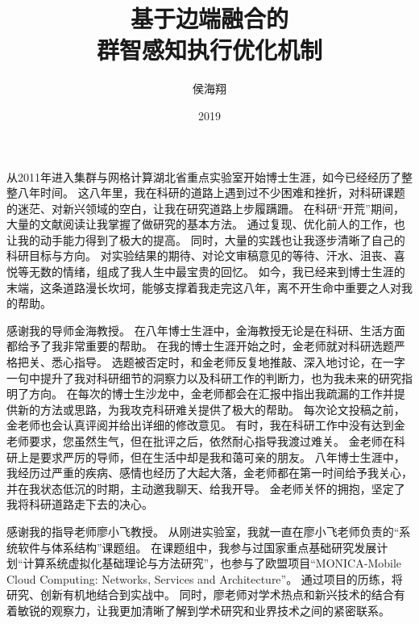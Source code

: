 \documentclass[format=draft,language=chinese,degree=phd,table,usenames,dvipsnames]{hustthesis}
\title{基于边端融合的\\群智感知执行优化机制}{Resources Scheduling Allocation and Optimization \protect{\\} for Mobile Crowdsensing in Edge Computing}
\author{侯海翔}{Haixiang Hou}
\date{2019}{6}{1}
\begin{document}
\frontmatter
\maketitle
\makeabstract
\tableofcontents
\listoffigures
\listoftables
\mainmatter













\begin{ack}

从2011年进入集群与网格计算湖北省重点实验室开始博士生涯，如今已经经历了整整八年时间。
这八年里，我在科研的道路上遇到过不少困难和挫折，对科研课题的迷茫、对新兴领域的空白，让我在研究道路上步履蹒跚。
在科研“开荒”期间，大量的文献阅读让我掌握了做研究的基本方法。
通过复现、优化前人的工作，也让我的动手能力得到了极大的提高。
同时，大量的实践也让我逐步清晰了自己的科研目标与方向。
对实验结果的期待、对论文审稿意见的等待、汗水、沮丧、喜悦等无数的情绪，组成了我人生中最宝贵的回忆。
如今，我已经来到博士生涯的末端，这条道路漫长坎坷，能够支撑着我走完这八年，离不开生命中重要之人对我的帮助。

感谢我的导师金海教授。
在八年博士生涯中，金海教授无论是在科研、生活方面都给予了我非常重要的帮助。
在我的博士生涯开始之时，金老师就对科研选题严格把关、悉心指导。
选题被否定时，和金老师反复地推敲、深入地讨论，在一字一句中提升了我对科研细节的洞察力以及科研工作的判断力，也为我未来的研究指明了方向。
在每次的博士生沙龙中，金老师都会在汇报中指出我疏漏的工作并提供新的方法或思路，为我攻克科研难关提供了极大的帮助。
每次论文投稿之前，金老师也会认真评阅并给出详细的修改意见。
有时，我在科研工作中没有达到金老师要求，您虽然生气，但在批评之后，依然耐心指导我渡过难关。
金老师在科研上是要求严厉的导师，但在生活中却是我和蔼可亲的朋友。
八年博士生涯中，我经历过严重的疾病、感情也经历了大起大落，金老师都在第一时间给予我关心，并在我状态低沉的时期，主动邀我聊天、给我开导。
金老师关怀的拥抱，坚定了我将科研道路走下去的决心。

感谢我的指导老师廖小飞教授。
从刚进实验室，我就一直在廖小飞老师负责的“系统软件与体系结构”课题组。
在课题组中，我参与过国家重点基础研究发展计划“计算系统虚拟化基础理论与方法研究”，也参与了欧盟项目“MONICA-Mobile Cloud Computing: Networks, Services and Architecture”。
通过项目的历练，将研究、创新有机地结合到实战中。
同时，廖老师对学术热点和新兴技术的结合有着敏锐的观察力，让我更加清晰了解到学术研究和业界技术之间的紧密联系。


\end{ack}
\end{document}
